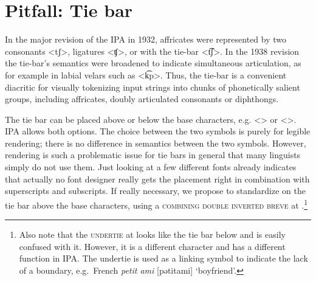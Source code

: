 



\section{Pitfall: Tie bar}
\label{pitfall-tie-bar}


In the major revision of the IPA in 1932, affricates were represented by two
consonants <tʃ>, ligatures <ʧ>, or with the tie-bar <t͡ʃ>. In the
1938 revision the tie-bar's semantics were broadened to indicate simultaneous
articulation, as for example in labial velars such as <k͡p>. Thus, the tie-bar is a
convenient diacritic for visually tokenizing input strings into chunks of
phonetically salient groups, including affricates, doubly articulated consonants
or diphthongs. 

The tie bar can be placed above or below the base characters, e.g.
<> or <>. IPA allows both options. The choice between
the two symbols is purely for legible rendering; there is no difference in
semantics between the two symbols. However, rendering is such a problematic
issue for tie bars in general that many linguists simply do not use them. Just
looking at a few different fonts already indicates that actually no font
designer really gets the placement right in combination with superscripts and
subscripts. If really necessary, we propose to standardize on the tie bar above
the base characters, using a \textsc{combining double inverted breve} at
.\footnote{Also note that the \textsc{undertie} at  looks
like the tie bar below and is easily confused with it. However, it is a
different character and has a different function in IPA. The undertie is used as
a linking symbol to indicate the lack of a boundary, e.g.\ French \textit{petit
ami} [pətitami] `boyfriend'.}

